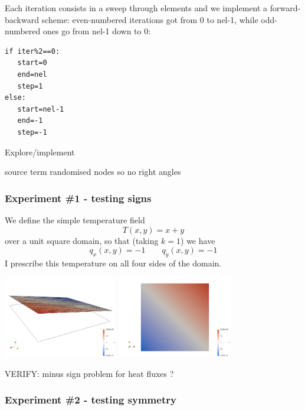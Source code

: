 Each iteration consists in a sweep through elements and we implement a forward-backward scheme:
even-numbered iterations got from 0 to nel-1, while odd-numbered ones go from nel-1 down to 0:
\begin{lstlisting}
if iter%2==0:
   start=0
   end=nel
   step=1
else:
   start=nel-1
   end=-1
   step=-1
\end{lstlisting}





\newpage

Explore/implement

source term
randomised nodes so no right angles




\subsubsection*{Experiment \#1 - testing signs} 

We define the simple temperature field 
\[
T(x,y)=x+y
\]
over a unit square domain, so that (taking $k=1$) we have
\[
q_x(x,y)=-1
\qquad
q_y(x,y)=-1
\]
I prescribe this temperature on all four sides of the domain. 

\begin{center}
\includegraphics[width=5cm]{python_codes/fieldstone_79/results/exp1/temp}
\includegraphics[width=5cm]{python_codes/fieldstone_79/results/exp1/temp2}
\end{center}


VERIFY: minus sign problem for heat fluxes ?


\subsubsection*{Experiment \#2 - testing symmetry} 

